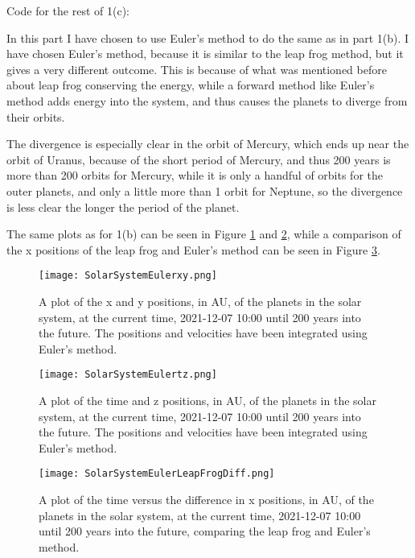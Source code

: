 Code for the rest of 1(c):


In this part I have chosen to use Euler's method to do the same as in part 1(b).
I have chosen Euler's method, because it is similar to the leap frog method, but it gives a very different outcome.
This is because of what was mentioned before about leap frog conserving the energy, while a forward method like Euler's method adds energy into the system, and thus causes the planets to diverge from their orbits.

The divergence is especially clear in the orbit of Mercury, which ends up near the orbit of Uranus, because of the short period of Mercury, and thus 200 years is more than 200 orbits for Mercury, while it is only a handful of orbits for the outer planets, and only a little more than 1 orbit for Neptune, so the divergence is less clear the longer the period of the planet.

The same plots as for 1(b) can be seen in Figure \ref{fig:Euxy} and \ref{fig:Eutz}, while a comparison of the x positions of the leap frog and Euler's method can be seen in Figure \ref{fig:LFEdiff}.

\begin{figure}[ht!]
  \centering
  \texttt{[image: SolarSystemEulerxy.png]}
  \caption{A plot of the x and y positions, in AU, of the planets in the solar system, at the current time, 2021-12-07 10:00 until 200 years into the future. The positions and velocities have been integrated using Euler's method.}
  \label{fig:Euxy}
\end{figure}

\begin{figure}[ht!]
  \centering
  \texttt{[image: SolarSystemEulertz.png]}
  \caption{A plot of the time and z positions, in AU, of the planets in the solar system, at the current time, 2021-12-07 10:00 until 200 years into the future. The positions and velocities have been integrated using Euler's method.}
  \label{fig:Eutz}
\end{figure}

\begin{figure}[ht!]
  \centering
  \texttt{[image: SolarSystemEulerLeapFrogDiff.png]}
  \caption{A plot of the time versus the difference in x positions, in AU, of the planets in the solar system, at the current time, 2021-12-07 10:00 until 200 years into the future, comparing the leap frog and Euler's method.}
  \label{fig:LFEdiff}
\end{figure}






